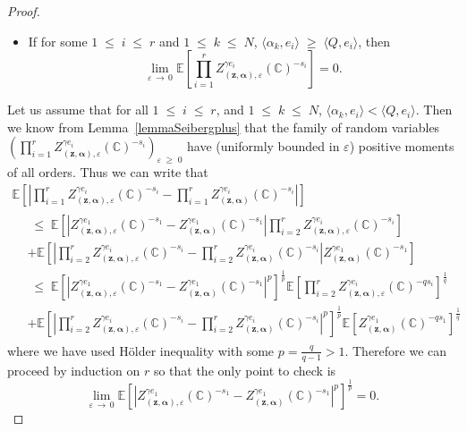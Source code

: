 \documentclass[10pt]{amsart}
\theoremstyle{definition}\newtheorem{defi}[theo]{Definition}\newtheorem{rema}[theo]{Remark}\newtheorem{exam}[theo]{Example}\newtheorem{exem}[theo]{Example}\newtheorem{nota}[theo]{Notation}
\renewcommand{\leq}{\;\leqslant\;}
\renewcommand{\geq}{\;\geqslant\;}
\newcommand{\C}{\mathbb{C}}
\newcommand{\E}{\mathbb{E}}
\newcommand{\ps}[1]{\langle #1 \rangle}
\newcommand*\eps{\varepsilon}
\newcommand{\norm}[1]{\left\lvert#1\right\rvert}
\begin{document}
\begin{proof}
\begin{itemize}
\item If for some $1\leq i \leq r$ and $1\leq k\leq N$, $\ps{\alpha_k,e_i}\geq\ps{Q,e_i}$, then
\begin{equation*}
\lim\limits_{\eps\,\rightarrow\,0}\E \left[\prod_{i=1}^{r} Z_{\left(\bm z,\bm \alpha\right), \eps}^{\gamma e_i} (\C)^{- s_i} \right]=0.
\end{equation*}
\end{itemize}
Let us assume that for all $1\leq i \leq r$, and $1\leq k\leq N$, $\ps{\alpha_k,e_i}<\ps{Q,e_i}$. Then we know from Lemma~\ref{lemmaSeibergplus} that the family of random variables 
$(\prod_{i=1}^{r} Z_{(\bm z,\bm \alpha), \eps}^{\gamma e_i} (\C)^{- s_i})_{\eps\geq0}$ have (uniformly bounded in $\eps$) positive moments of all orders. Thus we can write that
\begin{multline*}
\E \left [\left| \prod_{i=1}^{r} Z_{(\bm z,\bm \alpha), \eps}^{\gamma e_i} (\C)^{- s_i} - \prod_{i=1}^{r} Z_{(\bm z,\bm \alpha)}^{\gamma e_i} (\C)^{- s_i} \right| \right]\\
\begin{aligned}
&\leq \E \left [\left| Z_{(\bm z,\bm \alpha), \eps}^{\gamma e_1} (\C)^{- s_1}-Z_{(\bm z,\bm \alpha)}^{\gamma e_1} (\C)^{- s_1}\right| \prod_{i=2}^{r} Z_{(\bm z,\bm \alpha), \eps}^{\gamma e_i} (\C)^{- s_i} \right]\\
& +\E \left [\norm{ \prod_{i=2}^{r} Z_{(\bm z,\bm \alpha), \eps}^{\gamma e_i} (\C)^{- s_i} - \prod_{i=2}^{r} Z_{(\bm z,\bm \alpha)}^{\gamma e_i} (\C)^{- s_i} } Z_{(\bm z,\bm \alpha)}^{\gamma e_1} (\C)^{- s_1} \right]\\
&\leq \E \left [\norm{ Z_{(\bm z,\bm \alpha), \eps}^{\gamma e_1} (\C)^{- s_1}-Z_{(\bm z,\bm \alpha)}^{\gamma e_1} (\C)^{- s_1}}^p\right]^{\frac1p}\E\left[\prod_{i=2}^{r} Z_{(\bm z,\bm \alpha), \eps}^{\gamma e_i} (\C)^{- qs_i} \right]^{\frac 1q}\\
&+\E \left [\norm{ \prod_{i=2}^{r} Z_{(\bm z,\bm \alpha), \eps}^{\gamma e_i} (\C)^{- s_i} - \prod_{i=2}^{r} Z_{(\bm z,\bm \alpha)}^{\gamma e_i} (\C)^{- s_i} }^p\right]^{\frac1p}\E\left[Z_{(\bm z,\bm \alpha)}^{\gamma e_1} (\C)^{- qs_1} \right]^{\frac1q}
\end{aligned}
\end{multline*}
where we have used H\"older inequality with some $p=\frac{q}{q-1}>1$. Therefore we can proceed by induction on $r$ so that the only point to check is 
\[
\lim\limits_{\eps\,\to\,0}\E \left [\norm{ Z_{(\bm z,\bm \alpha), \eps}^{\gamma e_1} (\C)^{- s_1}-Z_{(\bm z,\bm \alpha)}^{\gamma e_1} (\C)^{- s_1}}^p\right]^{\frac1p}=0.
\]
\end{proof}
\end{document}
